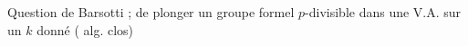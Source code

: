 
Question  de Barsotti ;   de plonger un groupe formel $p$-divisible dans une V.A. sur un $k$ donné ( alg. clos)

